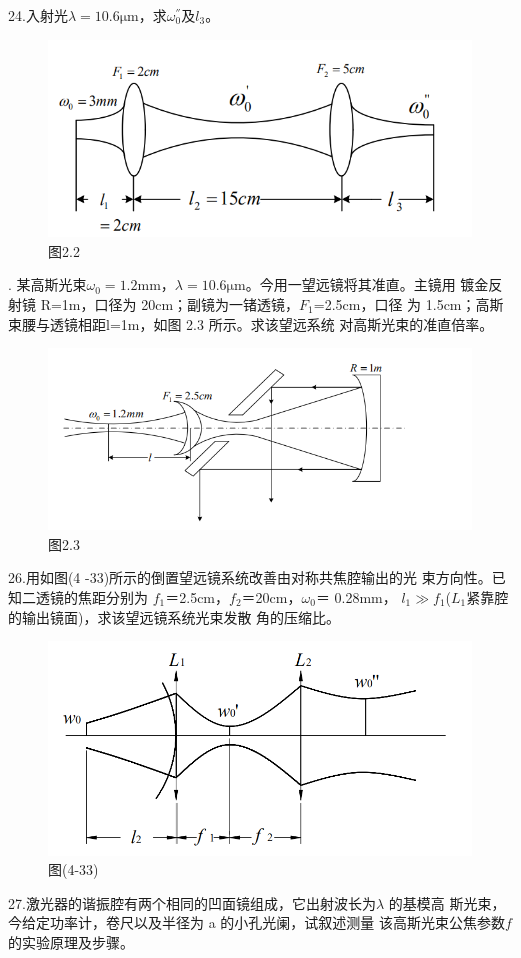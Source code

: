 \documentclass[12pt]{article}
\begin{document}
{\fangsong
	24.入射光$\lambda=10.6\si{\um}$，求$\omega_0^{''}\text{及}l_3$。
}

\begin{figure}[H]
	\centering
	\includegraphics[width=0.6\linewidth]{fig/23_new.png}
	\caption*{图2.2}%
\end{figure}

{. 某高斯光束$\omega_0=1.2$mm，$\lambda=10.6\si{\um}$。今用一望远镜将其准直。主镜用
镀金反射镜 R=1m，口径为 20cm；副镜为一锗透镜，$F_1$=2.5cm，口径
为 1.5cm；高斯束腰与透镜相距l=1m，如图 2.3 所示。求该望远系统
对高斯光束的准直倍率。
}
\begin{figure}[H]
	\centering
	\includegraphics[width=0.6\linewidth]{fig/25_new.png}
	\caption*{图2.3}%
\end{figure}

{\fangsong
26.用如图(4 -33)所示的倒置望远镜系统改善由对称共焦腔输出的光
束方向性。已知二透镜的焦距分别为 $f_1$＝2.5cm，$f_2$＝20cm，$\omega_0$＝ 0.28mm，
$l_1\gg f_1$($L_1$紧靠腔的输出镜面)，求该望远镜系统光束发散
角的压缩比。
}
\begin{figure}[H]
	\centering
	\includegraphics[width=0.6\linewidth]{fig/26_new.png}
	\caption*{图(4-33)}%
\end{figure}

{\fangsong
27.激光器的谐振腔有两个相同的凹面镜组成，它出射波长为$\lambda$ 的基模高
斯光束，今给定功率计，卷尺以及半径为 a 的小孔光阑，试叙述测量
该高斯光束公焦参数$f$的实验原理及步骤。
}
\end{document}
